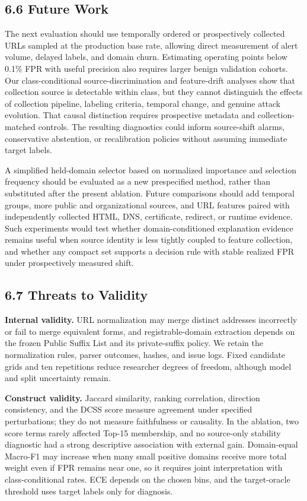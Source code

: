 \documentclass[
  10pt,
]{article}
\begin{document}
\subsection{6.6 Future Work}\label{future-work}

The next evaluation should use temporally ordered or prospectively
collected URLs sampled at the production base rate, allowing direct
measurement of alert volume, delayed labels, and domain churn.
Estimating operating points below 0.1\% FPR with useful precision also
requires larger benign validation cohorts. Our class-conditional
source-discrimination and feature-drift analyses show that collection
source is detectable within class, but they cannot distinguish the
effects of collection pipeline, labeling criteria, temporal change, and
genuine attack evolution. That causal distinction requires prospective
metadata and collection-matched controls. The resulting diagnostics
could inform source-shift alarms, conservative abstention, or
recalibration policies without assuming immediate target labels.

A simplified held-domain selector based on normalized importance and
selection frequency should be evaluated as a new prespecified method,
rather than substituted after the present ablation. Future comparisons
should add temporal groups, more public and organizational sources, and
URL features paired with independently collected HTML, DNS, certificate,
redirect, or runtime evidence. Such experiments would test whether
domain-conditioned explanation evidence remains useful when source
identity is less tightly coupled to feature collection, and whether any
compact set supports a decision rule with stable realized FPR under
prospectively measured shift.

\subsection{6.7 Threats to Validity}\label{threats-to-validity}

\textbf{Internal validity.} URL normalization may merge distinct
addresses incorrectly or fail to merge equivalent forms, and
registrable-domain extraction depends on the frozen Public Suffix List
and its private-suffix policy. We retain the normalization rules, parser
outcomes, hashes, and issue logs. Fixed candidate grids and ten
repetitions reduce researcher degrees of freedom, although model and
split uncertainty remain.

\textbf{Construct validity.} Jaccard similarity, ranking correlation,
direction consistency, and the DCSS score measure agreement under
specified perturbations; they do not measure faithfulness or causality.
In the ablation, two score terms rarely affected Top-15 membership, and
no source-only stability diagnostic had a strong descriptive association
with external gain. Domain-equal Macro-F1 may increase when many small
positive domains receive more total weight even if FPR remains near one,
so it requires joint interpretation with class-conditional rates. ECE
depends on the chosen bins, and the target-oracle threshold uses target
labels only for diagnosis.
\end{document}

